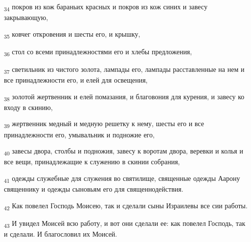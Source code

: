 \begin{tcolorbox}
\textsubscript{34} покров из кож бараньих красных и покров из кож синих и завесу закрывающую,
\end{tcolorbox}
\begin{tcolorbox}
\textsubscript{35} ковчег откровения и шесты его, и крышку,
\end{tcolorbox}
\begin{tcolorbox}
\textsubscript{36} стол со всеми принадлежностями его и хлебы предложения,
\end{tcolorbox}
\begin{tcolorbox}
\textsubscript{37} светильник из чистого золота, лампады его, лампады расставленные на нем и все принадлежности его, и елей для освещения,
\end{tcolorbox}
\begin{tcolorbox}
\textsubscript{38} золотой жертвенник и елей помазания, и благовония для курения, и завесу ко входу в скинию,
\end{tcolorbox}
\begin{tcolorbox}
\textsubscript{39} жертвенник медный и медную решетку к нему, шесты его и все принадлежности его, умывальник и подножие его,
\end{tcolorbox}
\begin{tcolorbox}
\textsubscript{40} завесы двора, столбы и подножия, завесу к воротам двора, веревки и колья и все вещи, принадлежащие к служению в скинии собрания,
\end{tcolorbox}
\begin{tcolorbox}
\textsubscript{41} одежды служебные для служения во святилище, священные одежды Аарону священнику и одежды сыновьям его для священнодействия.
\end{tcolorbox}
\begin{tcolorbox}
\textsubscript{42} Как повелел Господь Моисею, так и сделали сыны Израилевы все сии работы.
\end{tcolorbox}
\begin{tcolorbox}
\textsubscript{43} И увидел Моисей всю работу, и вот они сделали ее: как повелел Господь, так и сделали. И благословил их Моисей.
\end{tcolorbox}
